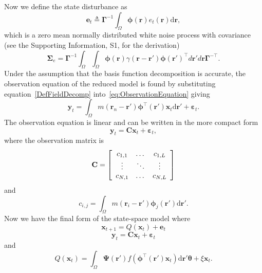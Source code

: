 \documentclass[12pt]{iopart}
\begin{document}
Now we define the state disturbance as
\begin{equation}\label{eq:Wt} 
	\mathbf{e}_t \triangleq \boldsymbol{\Gamma}^{-1}\int_\Omega {\boldsymbol{\phi} ( \mathbf{r} )e_t( \mathbf{r} )\textrm{d}\mathbf{r}},
\end{equation}
which is a zero mean normally distributed white noise process with covariance (see the Supporting Information, S1, for the derivation)
\begin{equation}
	\boldsymbol\Sigma_e =\mathbf{\Gamma}^{-1}\int_{\Omega}\int_{\Omega}\boldsymbol{\phi}\left(\mathbf r\right) \gamma\left(\mathbf r- \mathbf r' \right)\boldsymbol{\phi}\left(\mathbf r'\right)^{\top}d\mathbf r' d\mathbf r\mathbf{\Gamma}^{- \top}. 
\end{equation}
Under the assumption that the basis function decomposition is accurate, the observation equation of the reduced model is found by substituting equation~\ref{DefFieldDecomp} into~\ref{eq:ObservationEquation} giving
\begin{equation}\label{eq:ReducedObservationEquation}
	\mathbf{y}_t = \int_{\Omega}{m\left(\mathbf{r}_n-\mathbf{r}'\right)\boldsymbol{\phi}^{\top}\left(\mathbf{r'}\right) \mathbf{x}_t\textrm{d}\mathbf{r}'} + \boldsymbol{\varepsilon}_t. 
\end{equation}
The observation equation is linear and can be written in the more compact form
\begin{equation}\label{ObservationEquation} 
	\mathbf{y}_t = \mathbf{C}\mathbf{x}_t + \boldsymbol{\varepsilon}_t,
\end{equation}
where the observation matrix is 
\begin{equation}
	\mathbf{C} = \left[
	\begin{array}{{ccc}} 
		c_{1,1} & \dots & c_{1,L} \\
		\vdots & \ddots & \vdots \\
		c_{N,1} & \dots & c_{N,L} 
	\end{array}
	\right] 
\end{equation}
and 
\begin{equation}
	c_{i,j} = \int_{\Omega}m(\mathbf{r}_i - \mathbf{r}')\boldsymbol{\phi}_j(\mathbf{r}')\textrm{d}\mathbf{r}'. 
\end{equation}
Now we have the final form of the state-space model where
\begin{equation}\label{eq:finalformstatespacemodel}
	\mathbf{x}_{t+1} = Q(\mathbf{x}_t) +\mathbf{e}_t
\end{equation}
\begin{equation} 
	\mathbf{y}_t = \mathbf{C}\mathbf{x}_t + \boldsymbol{\varepsilon}_t
\end{equation}
and 
\begin{equation}\label{eq:QmatrixForSigmapoints}
	Q(\mathbf{x}_t) = \int_\Omega \boldsymbol{\Psi}(\mathbf{r}') f(\boldsymbol{\phi}^{\top}(\mathbf{r}')\mathbf{x}_t) \textrm{d}\mathbf{r}' \boldsymbol{\theta} + \xi\mathbf{x}_t.
\end{equation}
\end{document}
